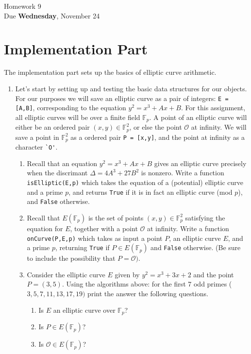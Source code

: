 \documentclass[11pt]{article}
\newcommand{\bF}{\mathbb{F}}
\newcommand{\cO}{\mathcal{O}}
\begin{document}
\begin{center}
\Large {Homework 9}\\
\small {Due \textbf{Wednesday}, November 24}\\
\end{center}
\section*{Implementation Part}
The implementation part sets up the basics of elliptic curve arithmetic.
\begin{enumerate}
\item{Let's start by setting up and testing the basic data structures for our objects.  For our purposes we will save an elliptic curve as a pair of integers: \verb|E = [A,B]|, corresponding to the equation $y^2 = x^3 + Ax + B$.  For this assignment, all elliptic curves will be over a finite field $\bF_p$.  A point of an elliptic curve will either be an ordered pair $(x,y)\in\bF_p^2$, or else the point $\cO$ at infinity.  We will save a point in $\bF_p^2$ as a ordered pair \verb|P = [x,y]|, and the point at infinity as a character \verb|`O'|.
  \begin{enumerate}
    \item{
    Recall that an equation $y^2 = x^3 + Ax + B$ gives an elliptic curve precisely when the discrimant $\Delta = 4A^3 + 27B^2$ is nonzero.  Write a function \verb|isElliptic(E,p)| which takes the equation of a (potential) elliptic curve and a prime $p$, and returns \verb|True| if it is in fact an elliptic curve (mod $p$), and \verb|False| otherwise.
    }
    \item{
    Recall that $E(\bF_p)$ is the set of points $(x,y)\in\bF_p^2$ satisfying the equation for $E$, together with a point $\cO$ at infinity.   Write a function \verb|onCurve(P,E,p)| which takes as input a point $P$, an elliptic curve $E$, and a prime $p$, returning \verb|True| if $P\in E(\bF_p)$ and \verb|False| otherwise.  (Be sure to include the possibility that $P=\cO)$.
    }
    \item{
    Consider the elliptic curve $E$ given by $y^2 = x^3 + 3x + 2$ and the point $P=(3,5)$.  Using the algorithms above: for the first 7 odd primes ($3,5,7,11,13,17,19)$ print the answer the following questions.
    \begin{enumerate}
      \item{Is $E$ an elliptic curve over $\bF_p$?}
      \item{Is $P\in E(\bF_p)$?}
      \item{Is $\cO\in E(\bF_p)$?}

\end{enumerate}}
\end{enumerate}}
\end{enumerate}
\end{document}
